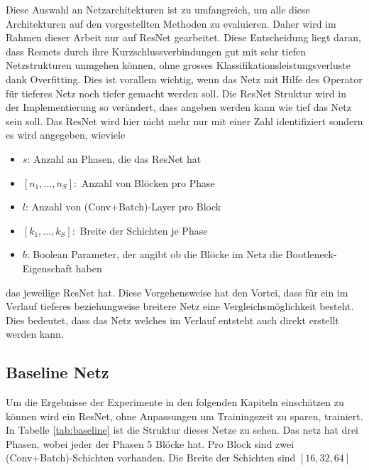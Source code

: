 Diese Auswahl an Netzarchitekturen ist zu umfangreich, um alle diese Architekturen auf den vorgestellten Methoden zu evaluieren. Daher wird im Rahmen dieser Arbeit nur auf ResNet gearbeitet. Diese Entscheidung liegt daran, dass Resnets durch ihre Kurzschlussverbindungen gut mit sehr tiefen Netzstrukturen unmgehen können, ohne grosses Klassifikationsleistungsverluste dank Overfitting. Dies ist vorallem wichtig, wenn das Netz mit Hilfe des Operator für tieferes Netz noch tiefer gemacht werden soll. Die ResNet Struktur wird in der Implementierung so verändert, dass angeben werden kann wie tief das Netz sein soll. Das ResNet wird hier nicht mehr nur mit einer Zahl identifiziert sondern es wird angegeben, wieviele
\begin{itemize}
 \item $s$: Anzahl an Phasen, die das ResNet hat
 \item $[n_1, \ldots, n_S]:$ Anzahl von Blöcken pro Phase 
 \item $l$: Anzahl von (Conv+Batch)-Layer pro Block
 \item $[k_1, \ldots,k_S ]:$ Breite der Schichten je Phase
 \item $b$: Boolean Parameter, der angibt ob die Blöcke im Netz die Bootleneck-Eigenschaft haben
\end{itemize}
das jeweilige ResNet hat. Diese Vorgehensweise hat den Vortei, dass für ein im Verlauf tieferes beziehungweise breitere Netz eine Vergleichsmöglichkeit besteht. Dies bedeutet, dass das Netz welches im Verlauf entsteht auch direkt erstellt werden kann.


\color{blue1}
\subsection{Baseline Netz}\label{sec:baseline}
Um die Ergebnisse der Experimente in den folgenden Kapiteln einschätzen zu können wird ein ResNet, ohne Anpassungen um Trainingszeit zu sparen, trainiert. In Tabelle \ref{tab:baseline} ist die Struktur dieses Netze zu sehen. Das netz hat drei Phasen, wobei jeder der Phasen 5 Blöcke hat. Pro Block sind zwei (Conv+Batch)-Schichten vorhanden. Die Breite der Schichten sind $[16,32,64]$

